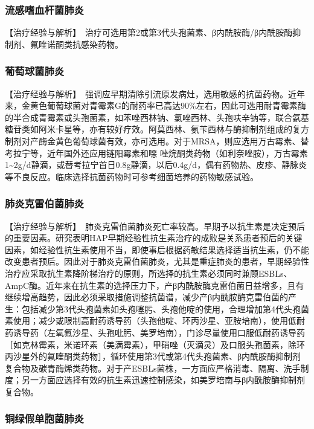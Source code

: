 \subsubsection{流感嗜血杆菌肺炎}

【治疗经验与解析】　治疗可选用第2或第3代头孢菌素、β内酰胺酶/β内酰胺酶抑制剂、氟喹诺酮类抗感染药物。

\subsubsection{葡萄球菌肺炎}

【治疗经验与解析】　强调应早期清除引流原发病灶，选用敏感的抗菌药物。近年来，金黄色葡萄球菌对青霉素G的耐药率已高达90\%左右，因此可选用耐青霉素酶的半合成青霉素或头孢菌素，如苯唑西林钠、氯唑西林、头孢呋辛钠等，联合氨基糖苷类如阿米卡星等，亦有较好疗效。阿莫西林、氨苄西林与酶抑制剂组成的复方制剂对产酶金黄色葡萄球菌有效，亦可选用。对于MRSA，则应选用万古霉素、替考拉宁等，近年国外还应用链阳霉素和噁
唑烷酮类药物（如利奈唑胺），万古霉素1\textasciitilde{}2g/d静滴，或替考拉宁首日0.8g静滴，以后0.4g/d，偶有药物热、皮疹、静脉炎等不良反应。临床选择抗菌药物时可参考细菌培养的药物敏感试验。

\subsubsection{肺炎克雷伯菌肺炎}

【治疗经验与解析】　肺炎克雷伯菌肺炎死亡率较高。早期予以抗生素是决定预后的重要因素。研究表明HAP早期经验性抗生素治疗的成败是关系患者预后的关键因素，如经验性抗生素使用不当，即使事后根据药敏结果选择适当抗生素，仍不能改变患者预后。因此对于肺炎克雷伯菌肺炎，尤其是重症肺炎的患者，早期经验性治疗应采取抗生素降阶梯治疗的原则，所选择的抗生素必须同时兼顾ESBLs、AmpC酶。近年来在抗生素的选择压力下，产β内酰胺酶克雷伯菌日益增多，且有继续增高趋势，因此必须采取措施调整抗菌谱，减少产β内酰胺酶克雷伯菌的产生：包括减少第3代头孢菌素如头孢噻肟、头孢他啶的使用，合理增加第4代头孢菌素使用；减少或限制高耐药诱导药（头孢他啶、环丙沙星、亚胺培南），使用低耐药诱导药（左氧氟沙星、头孢吡肟、美罗培南），门诊尽量使用口服低耐药诱导药［如克林霉素，米诺环素（美满霉素），甲硝唑（灭滴灵）及口服头孢菌素，除环丙沙星外的氟喹酮类药物］，循环使用第3代或第4代头孢菌素、β内酰胺酶抑制剂复合物及碳青酶烯类药物。对于产ESBLs菌株，一方面应严格消毒、隔离、洗手制度；另一方面应选择有效的抗生素迅速控制感染，如美罗培南与β内酰胺酶抑制剂复合物。

\subsubsection{铜绿假单胞菌肺炎}

